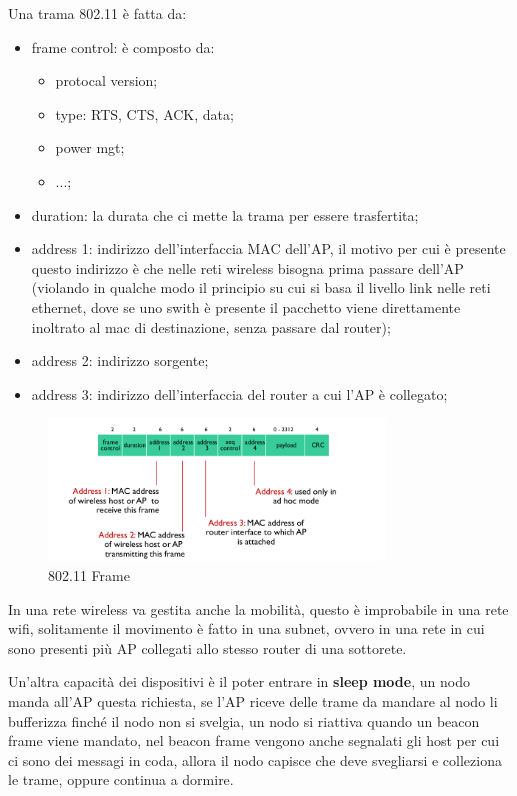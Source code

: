 \documentclass[12pt]{article}
\begin{document}
Una trama 802.11 \`e fatta da:
\begin{itemize}
    \item frame control: \`e composto da:
        \begin{itemize}
            \item protocal version;
            \item type: RTS, CTS, ACK, data;
            \item power mgt;
            \item ...;
        \end{itemize}
    \item duration: la durata che ci mette la trama per essere trasfertita;
    \item address 1: indirizzo dell'interfaccia MAC dell'AP, il motivo per cui \`e presente questo indirizzo \`e che nelle reti wireless bisogna prima passare dell'AP (violando in qualche modo il principio su cui si basa il livello link nelle reti ethernet, dove se uno swith \`e presente il pacchetto viene direttamente inoltrato al mac di destinazione, senza passare dal router);
    \item address 2: indirizzo sorgente;
    \item address 3: indirizzo dell'interfaccia del router a cui l'AP \`e collegato;
\end{itemize}
\begin{figure}[H]
    \centering
    \includegraphics[width=0.8\textwidth]{802.11-frame.png}
    \caption{802.11 Frame}
    \label{fig:802.11-frame}
\end{figure}

In una rete wireless va gestita anche la mobilit\`a, questo \`e improbabile in una rete wifi, solitamente il movimento \`e fatto in una subnet, ovvero in una rete in cui sono presenti pi\`u AP collegati allo stesso router di una sottorete.

Un'altra capacit\`a dei dispositivi \`e il poter entrare in \textbf{sleep mode}, un nodo manda all'AP questa richiesta, se l'AP riceve delle trame da mandare al nodo li bufferizza finch\'e il nodo non si svelgia, un nodo si riattiva quando un beacon frame viene mandato, nel beacon frame vengono anche segnalati gli host per cui ci sono dei messagi in coda, allora il nodo capisce che deve svegliarsi e colleziona le trame, oppure continua a dormire.
\end{document}
